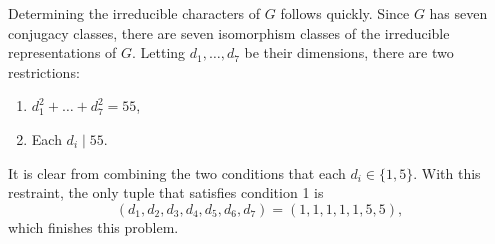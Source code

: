 \documentclass[12pt]{article}
\begin{document}
Determining the irreducible characters of $G$ follows quickly. 
Since $G$ has seven conjugacy classes, there are seven isomorphism classes of the irreducible representations of $G$. 
Letting $d_1, \ldots, d_7$ be their dimensions, there are two restrictions: 
\begin{enumerate}
  \item $d_{1}^{2} + \ldots + d_{7}^{2} = 55$, 
  \item Each $d_i \mid 55$. 
\end{enumerate}
It is clear from combining the two conditions that each $d_i \in \{1, 5\}$. 
With this restraint, the only tuple that satisfies condition 1 is 
$$(d_1, d_2, d_3, d_4, d_5, d_6, d_7) = (1, 1, 1, 1, 1, 5, 5),$$
which finishes this problem.
\end{document}
